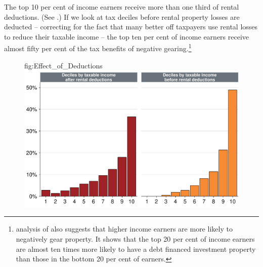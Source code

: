 \documentclass{grattan}\usepackage[]{graphicx}\usepackage[]{color}
\newcommand\gao{Grattan analysis of}
\begin{document}
The top 10 per cent of income earners receive more than one third of rental deductions. (See .) If we look at tax deciles before rental property losses are deducted -- correcting for the fact that many better off taxpayers use rental losses to reduce their taxable income -- the top ten per cent of income earners receive almost fifty per cent of the tax benefits of negative gearing.\footnote{\textcite{RBA2015} analysis of \textcite{HILDA2015} also suggests that higher income earners are more likely to negatively gear property. It shows that the top 20 per cent of income earners are almost ten times more likely to have a debt financed investment property than those in the bottom 20 per cent of earners.} 





\begin{figure}
  {fig:Effect_of_Deductions}
\includegraphics[width=\columnwidth]{figure/Effect_of_Deductions-1}

\source{\gao\ \textcite{ATO2013i}}
\end{figure}


% 
\end{document}
